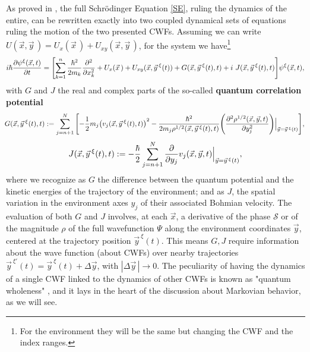 \documentclass[11pt, a4paper]{article} %
\begin{document}
As proved in \cite{GJ}, the full Schrödinger Equation \eqref{SE}, ruling the dynamics of the entire, can be rewritten exactly into two coupled dynamical sets of equations ruling the motion of the two presented CWFs. Assuming we can write $U(\vec{x},\vec{y}\,)=U_x(\vec{x}\,)+U_{xy}(\vec{x},\vec{y}\,)$, for the system we have\footnote{For the environment they will be the same but changing the CWF and the index ranges.}\vspace{-0.2cm}
\begin{equation}\label{SE.GJ}
i \hbar \pdv{\psi^\xi (\vec{x},t)}{t} = \qty[\sum_{k=1}^n\frac{\hbar^2}{2m_k} \pdv[2]{}{x_k} + U_x(\vec{x}\,)+ U_{xy}(\vec{x}, \vec{y}^{\: \xi}(t)) + G(\vec{x}, \vec{y}^{\: \xi}(t),t)+i\ J(\vec{x}, \vec{y}^{\: \xi}(t),t)] \psi^\xi (\vec{x},t),
\end{equation}
with $G$ and $J$ the real and complex parts of the so-called {\bf quantum correlation potential}
\begin{equation}\label{G.Bohm}\hspace{-0.1cm}
G(\vec{x},\vec{y}^{\:\xi}(t),t):=\sum_{j=n+1}^N\qty[-\frac{1}{2}m_j\qty(v_j(\vec{x},\vec{y}^{\: \xi}(t),t))^2-\frac{\hbar^2}{2m_j\rho^{1/2}(\vec{x},\vec{y}^{\:\xi}(t),t)}\qty(\pdv[2]{\rho^{1/2}(\vec{x},\vec{y},t)}{y_j})\Big\rvert_{\vec{y}=\vec{y}^{\:\xi}(t)} ],
\end{equation}
\begin{equation}\label{J.Bohm}
J(\vec{x},\vec{y}^{\:\xi}(t),t):=-\frac{\hbar}{2}\sum_{j=n+1}^N\pdv{}{y_j}v_j(\vec{x},\vec{y},t)\Big\rvert_{\vec{y}=\vec{y}^{\, \xi}(t)},
\end{equation}
where we recognize as $G$ the difference between the quantum potential \cite{JordiXavier, Durr} and the kinetic energies of the trajectory of the environment; and as $J$, the spatial variation in the environment axes $y_j$ of their associated Bohmian velocity. The evaluation of both $G$ and $J$ involves, at each $\vec{x}$, a derivative of the phase $\mathcal{S}$ or of the magnitude $\rho$ of the full wavefunction $\Psi$ along the environment coordinates $\vec{y}$, centered at the trajectory position $\vec{y}^{\:\xi}(t)$. This means $G,J$ require information about the wave function (about CWFs) over nearby trajectories $\vec{y}^{\:\xi'}(t)=\vec{y}^{\:\xi}(t)+\Delta \vec y$, with $|\Delta\vec y\, |\rightarrow 0$. The peculiarity of having the dynamics of a single CWF linked to the dynamics of other CWFs is known as "quantum wholeness" \cite{JordiXavier}, and it lays in the heart of the discussion about Markovian behavior, as we will see.
\end{document}
